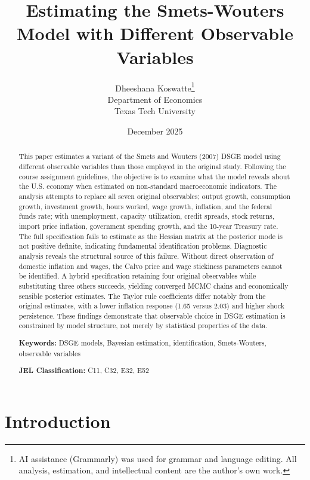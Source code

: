 \documentclass[12pt]{article}
\title{\textbf{Estimating the Smets-Wouters Model with Different Observable Variables}}
\author{Dheeshana Koswatte\thanks{AI assistance (Grammarly) was used for grammar and language editing. All analysis, estimation, and intellectual content are the author's own work.}\\Department of Economics\\Texas Tech University}
\date{December 2025}
\begin{document}
\maketitle

\begin{abstract}
\noindent This paper estimates a variant of the Smets and Wouters (2007) DSGE model using different observable variables than those employed in the original study. Following the course assignment guidelines, the objective is to examine what the model reveals about the U.S. economy when estimated on non-standard macroeconomic indicators. The analysis attempts to replace all seven original observables; output growth, consumption growth, investment growth, hours worked, wage growth, inflation, and the federal funds rate; with unemployment, capacity utilization, credit spreads, stock returns, import price inflation, government spending growth, and the 10-year Treasury rate. The full specification fails to estimate as the Hessian matrix at the posterior mode is not positive definite, indicating fundamental identification problems. Diagnostic analysis reveals the structural source of this failure. Without direct observation of domestic inflation and wages, the Calvo price and wage stickiness parameters cannot be identified. A hybrid specification retaining four original observables while substituting three others succeeds, yielding converged MCMC chains and economically sensible posterior estimates. The Taylor rule coefficients differ notably from the original estimates, with a lower inflation response (1.65 versus 2.03) and higher shock persistence. These findings demonstrate that observable choice in DSGE estimation is constrained by model structure, not merely by statistical properties of the data.

\vspace{0.3cm}
\noindent\textbf{Keywords:} DSGE models, Bayesian estimation, identification, Smets-Wouters, observable variables

\noindent\textbf{JEL Classification:} C11, C32, E32, E52
\end{abstract}

\newpage
\tableofcontents
\newpage

\section{Introduction}
\end{document}

